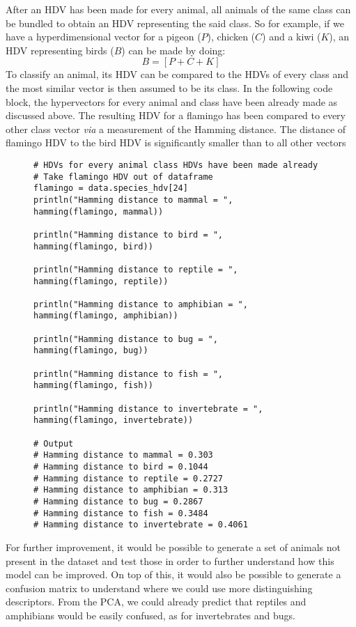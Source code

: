 After an HDV has been made for every animal, all animals of the same class can be bundled to obtain an HDV representing the said class. So for example, if we have a hyperdimensional vector for a pigeon ($P$), chicken ($C$) and a kiwi ($K$), an HDV representing birds ($B$) can be made by doing:
\begin{equation}
    B = [P + C + K]
\end{equation} 
To classify an animal, its HDV can be compared to the HDVs of every class and the most similar vector is then assumed to be its class.  In the following code block, the hypervectors for every animal and class have been already made as discussed above. The resulting HDV for a flamingo has been compared to every other class vector \textit{via} a measurement of the Hamming distance. The distance of flamingo HDV to the bird HDV is significantly smaller than to all other vectors
\begin{figure}[H]
    \centering
\begin{verbatim}
# HDVs for every animal class HDVs have been made already
# Take flamingo HDV out of dataframe
flamingo = data.species_hdv[24]
println("Hamming distance to mammal = ",
hamming(flamingo, mammal))

println("Hamming distance to bird = ",
hamming(flamingo, bird))

println("Hamming distance to reptile = ",
hamming(flamingo, reptile))

println("Hamming distance to amphibian = ",
hamming(flamingo, amphibian))

println("Hamming distance to bug = ",
hamming(flamingo, bug))

println("Hamming distance to fish = ",
hamming(flamingo, fish))

println("Hamming distance to invertebrate = ",
hamming(flamingo, invertebrate))

# Output
# Hamming distance to mammal = 0.303
# Hamming distance to bird = 0.1044
# Hamming distance to reptile = 0.2727
# Hamming distance to amphibian = 0.313
# Hamming distance to bug = 0.2867
# Hamming distance to fish = 0.3484
# Hamming distance to invertebrate = 0.4061
\end{verbatim}
\end{figure}
For further improvement, it would be possible to generate a set of animals not present in the dataset and test those in order to further understand how this model can be improved. On top of this, it would also be possible to generate a confusion matrix to understand where we could use more distinguishing descriptors. From the PCA, we could already predict that reptiles and amphibians would be easily confused, as for invertebrates and bugs.
